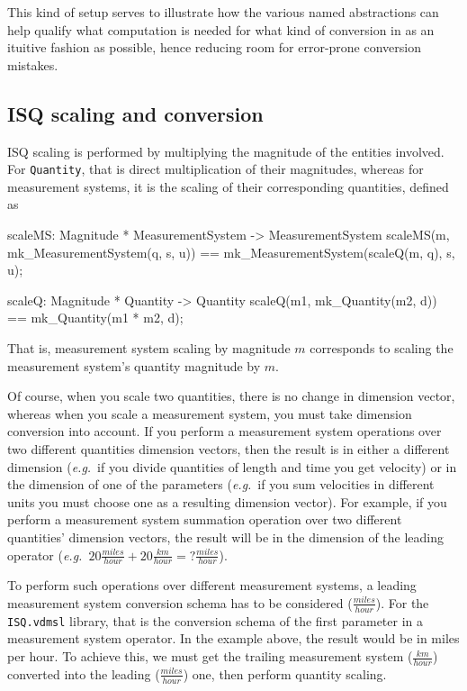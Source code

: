 \documentclass[runningheads,a4paper]{llncs}
\begin{document}
This kind of setup serves to illustrate how the various named abstractions can help qualify what computation is needed for what kind of conversion in as an ituitive fashion as possible, hence reducing room for error-prone conversion mistakes.  

\subsection*{ISQ scaling and conversion}

ISQ scaling is performed by multiplying the magnitude of the entities involved. For \texttt{Quantity}, that is direct multiplication of their magnitudes, whereas for measurement systems, it is the scaling of their corresponding quantities, defined as
%
\begin{vdmsl}[frame=none,basicstyle=\ttfamily\scriptsize]
    scaleMS: Magnitude * MeasurementSystem -> MeasurementSystem
    scaleMS(m, mk_MeasurementSystem(q, s, u)) == 
        mk_MeasurementSystem(scaleQ(m, q), s, u);

    scaleQ: Magnitude * Quantity -> Quantity
    scaleQ(m1, mk_Quantity(m2, d)) == mk_Quantity(m1 * m2, d);
\end{vdmsl} 
%
\noindent That is, measurement system scaling by magnitude \(m\) corresponds to scaling the measurement system's quantity magnitude by \(m\). 

Of course, when you scale two quantities, there is no change in dimension vector, whereas when you scale a measurement system, you must take dimension conversion into account. If you perform a measurement system operations over two different quantities dimension vectors, then the result is in either a different dimension (\textit{e.g.}~if you divide quantities of length and time you get velocity) or in the dimension of one of the parameters (\textit{e.g.}~if you sum velocities in different units you must choose one as a resulting dimension vector). For example, if you perform a measurement system summation operation over two different quantities' dimension vectors, the result will be in the dimension of the leading operator (\textit{e.g.}~\(20\frac{miles}{hour} + 20\frac{km}{hour} = ?\frac{miles}{hour}\)).

To perform such operations over different measurement systems, a leading measurement system conversion schema has to be considered (\(\frac{miles}{hour}\)). For the \texttt{ISQ.vdmsl} library, that is the conversion schema of the first parameter in a measurement system operator. In the example above, the result would be in miles per hour. To achieve this, we must get the trailing measurement system (\(\frac{km}{hour}\)) converted into the leading (\(\frac{miles}{hour}\)) one, then perform quantity scaling.
\end{document}
